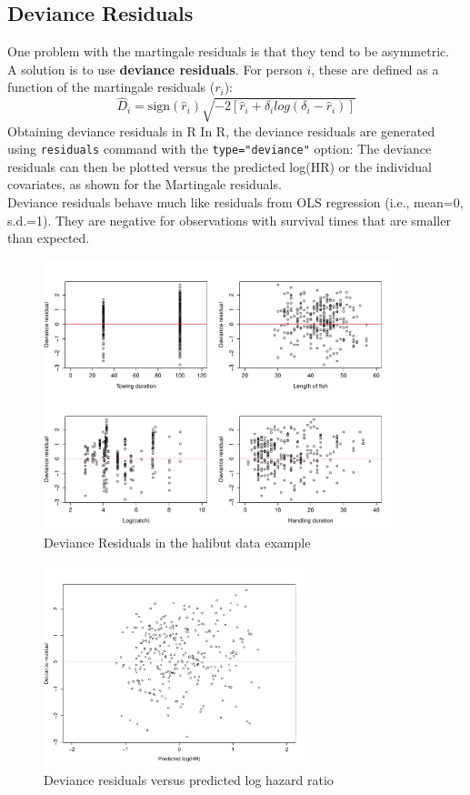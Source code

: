 \documentclass[11pt]{book}
\begin{document}
\subsection{Deviance Residuals}
One problem with the martingale residuals is that they tend to be
asymmetric.
\\[2ex]
A solution is to use {\bf deviance residuals}.
For person $i$, these are defined as a function of the
martingale residuals ($r_i$):
\[ \hat{D}_i  =   \mbox{sign}(\hat{r}_i)  \sqrt{-2[\hat{r}_i +
                   \delta_i log(\delta_i-\hat{r}_i)]}  \]
{Obtaining deviance residuals in R}
In R, the deviance residuals are generated using {\tt residuals} command with the {\tt type="deviance"} option:
\noindent
The deviance residuals can then be plotted versus the predicted log(HR) or the
individual covariates, as shown for the Martingale residuals.
\\[2ex]
Deviance residuals behave much like residuals from OLS regression (i.e., mean=0, s.d.=1).  They are negative for observations with survival times that are smaller than expected.
\begin{figure}[h!]
\caption{Deviance Residuals in the halibut data example}
\centerline{\includegraphics[width=4in]{dev_res.pdf}}
\end{figure}
\begin{figure}[h]
\caption{Deviance residuals versus predicted log hazard ratio}
\centerline{\includegraphics[width=3in]{devres_pred.pdf}}
\end{figure}
\end{document}
